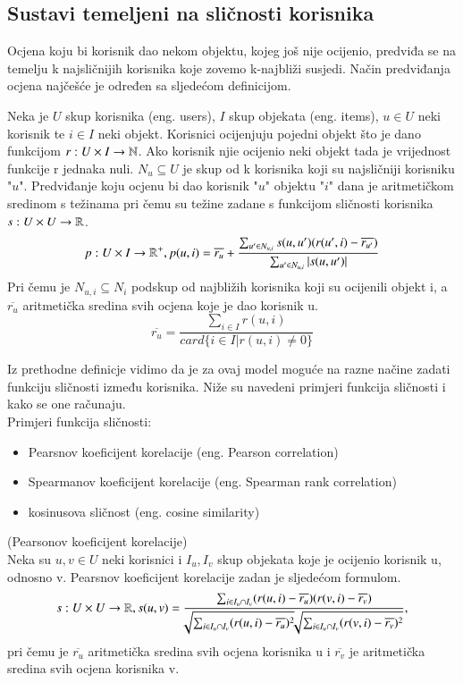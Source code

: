 \documentclass[a4paper,oneside,12pt]{memoir} %
\begin{document}
\subsection{Sustavi temeljeni na sličnosti korisnika}
\par
Ocjena koju bi korisnik dao nekom objektu, kojeg još nije ocijenio, predviđa se na temelju k najsličnijih korisnika koje zovemo k-najbliži susjedi. Način predviđanja ocjena najčešće je određen sa sljedećom definicijom.
\begin{defn}
Neka je $U$ skup korisnika (eng. users), $I$ skup objekata (eng. items), $u\in U$ neki korisnik te $i\in I$ neki objekt. Korisnici ocijenjuju pojedni objekt što je dano funkcijom $r:U\times I \rightarrow \mathbb{N}$. Ako korisnik njie ocijenio neki objekt tada je vrijednost funkcije r jednaka nuli. $N_u \subseteq U$ je skup od k korisnika koji su najsličniji korisniku "$u$". Predviđanje koju ocjenu bi dao korisnik "$u$" objektu "$i$" dana je aritmetičkom sredinom s težinama pri čemu su težine zadane s funkcijom sličnosti korisnika $s:U\times U\rightarrow \mathbb{R}$. 
\[ p:U\times I \rightarrow \mathbb{R}^+, p(u,i) = \overline{r_{u}}+\frac{\sum_{u'\in N_{u,i}}s(u,u')(r(u',i)-\overline{r_{u'}})}{\sum_{u'\in N_{u,i}}|s(u,u')|} \]
Pri čemu je $N_{u,i} \subseteq N_i$ podskup od najbližih korisnika koji su ocijenili objekt i, a $\overline{r_{u}}$ aritmetička sredina svih ocjena koje je dao korisnik u.
\[ \overline{r_{u}}=\frac{\sum_{i\in I}r(u,i)}{card\{i\in I | r(u,i) \neq 0 \} } \]
\end{defn}
\par
Iz prethodne definicje vidimo da je za ovaj model moguće na razne načine zadati funkciju sličnosti između korisnika. Niže su navedeni primjeri funkcija sličnosti i kako se one računaju.
\bigskip
\\Primjeri funkcija sličnosti:
\begin{itemize}[topsep=2pt]
\setlength{\parskip}{0pt}
\item Pearsnov koeficijent korelacije (eng. Pearson correlation)
\item Spearmanov koeficijent korelacije (eng. Spearman rank correlation)
\item kosinusova sličnost (eng. cosine similarity)
\end{itemize}
\begin{defn} (Pearsonov koeficijent korelacije)
\\Neka su $u, v\in U$ neki korisnici i $I_u, I_v$ skup objekata koje je ocijenio korisnik u, odnosno v. Pearsnov koeficijent korelacije zadan je sljedećom formulom.
\[ s:U\times U \rightarrow \mathbb{R}, s(u,v) = \frac{\sum_{i\in I_u\cap I_v}(r(u,i)-\overline{r_u})(r(v,i)-\overline{r_v})}{\sqrt[]{\sum_{i\in I_u\cap I_v}(r(u,i)-\overline{r_u})^2} \sqrt[]{\sum_{i\in I_u\cap I_v}(r(v,i)-\overline{r_v})^2} },  \]
pri čemu je $\overline{r_u}$ aritmetička sredina svih ocjena korisnika u i $\overline{r_v}$ je aritmetička sredina svih ocjena korisnika v.
\end{defn}
\end{document}
